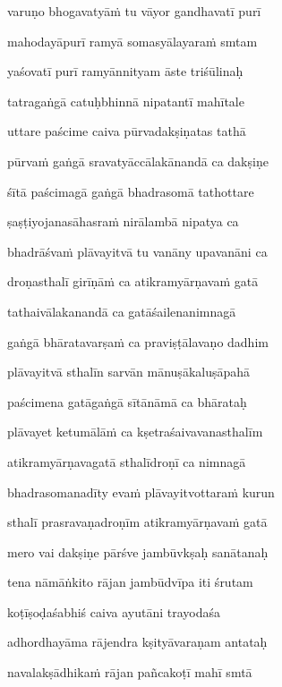 varuṇo bhogavatyāṁ tu vāyor gandhavatī purī\thinspace{\dandab} \dontdisplaylinenum

mahodayāpurī ramyā somasyālayaraṁ smtam \veg\dontdisplaylinenum

yaśovatī purī ramyānnityam āste triśūlinaḥ\thinspace{\dandab} \dontdisplaylinenum

tatragaṅgā catuḥbhinnā nipatantī mahītale \veg\dontdisplaylinenum

uttare paścime caiva pūrvadakṣiṇatas tathā\thinspace{\dandab} \dontdisplaylinenum

pūrvaṁ gaṅgā sravatyāccālakānandā ca dakṣiṇe \veg\dontdisplaylinenum

śītā paścimagā gaṅgā bhadrasomā tathottare\thinspace{\dandab} \dontdisplaylinenum

ṣaṣṭiyojanasāhasraṁ nirālambā nipatya ca \veg\dontdisplaylinenum

bhadrāśvaṁ plāvayitvā tu vanāny upavanāni ca\thinspace{\dandab} \dontdisplaylinenum

droṇasthalī girīṇāṁ ca atikramyārṇavaṁ gatā \veg\dontdisplaylinenum

tathaivālakanandā ca gatāśailenanimnagā\thinspace{\dandab} \dontdisplaylinenum

gaṅgā bhāratavarṣaṁ ca praviṣṭālavaṇo dadhim \veg\dontdisplaylinenum

plāvayitvā sthalīn sarvān mānuṣākaluṣāpahā\thinspace{\dandab} \dontdisplaylinenum

paścimena gatāgaṅgā sītānāmā ca bhārataḥ \veg\dontdisplaylinenum

plāvayet ketumālāṁ ca kṣetraśaivavanasthalīm\thinspace{\dandab} \dontdisplaylinenum

atikramyārṇavagatā sthalīdroṇī ca nimnagā \veg\dontdisplaylinenum

bhadrasomanadīty evaṁ plāvayitvottaraṁ kurun\thinspace{\dandab} \dontdisplaylinenum

sthalī prasravaṇadroṇīm atikramyārṇavaṁ gatā \veg\dontdisplaylinenum

mero vai dakṣiṇe pārśve jambūvkṣaḥ sanātanaḥ\thinspace{\dandab} \dontdisplaylinenum

tena nāmāṅkito rājan jambūdvīpa iti śrutam \veg\dontdisplaylinenum

koṭīṣoḍaśabhiś caiva ayutāni trayodaśa\thinspace{\dandab} \dontdisplaylinenum

adhordhayāma rājendra kṣityāvaraṇam antataḥ \veg\dontdisplaylinenum

navalakṣādhikaṁ rājan pañcakoṭī mahī smtā\thinspace{\dandab} \dontdisplaylinenum

